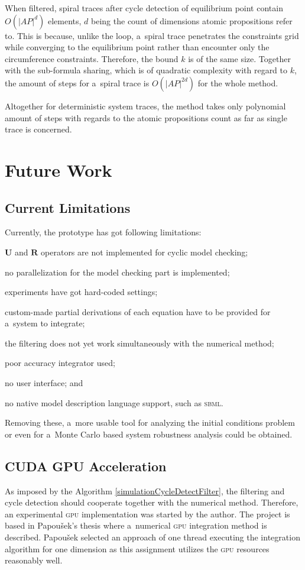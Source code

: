 \documentclass[12pt,twoside,draft]{fithesis}
\newcommand{\bU}{\mathbf{U}}
\newcommand{\bR}{\mathbf{R}}
\begin{document}
When filtered, spiral traces after cycle detection of equilibrium point
contain $O(|AP|^d)$ elements, $d$ being the count of dimensions atomic
propositions refer to. This is because, unlike the loop, a~spiral trace
penetrates the constraints grid while converging to the equilibrium
point rather than encounter only the circumference constraints.
Therefore, the bound $k$ is of the same size. Together with the
sub-formula sharing, which is of quadratic complexity with regard to $k$,
the amount of steps for a~spiral trace is $O(|AP|^{2d})$ for the whole
method.

Altogether for deterministic system traces, the method takes only
polynomial amount of steps with regards to the atomic propositions
count as far as single trace is concerned.

\chapter{Future Work}
\section{Current Limitations}
Currently, the prototype has got following limitations:
\begin{inparaenum}
\item $\bU$ and $\bR$ operators are not implemented for cyclic model
	checking;
\item no parallelization for the model checking part is implemented;
\item experiments have got hard-coded settings;
\item custom-made partial derivations of each equation have to be
	provided for a~system to integrate;
\item the filtering does not yet work simultaneously with the numerical
	method;
\item poor accuracy integrator used;
\item no user interface; and
\item no native model description language support, such as
	\textsc{sbml}\cite{sbml}.
\end{inparaenum}

Removing these, a~more usable tool for analyzing the initial conditions
problem\cite{sven} or even for a~Monte Carlo based system robustness
analysis\cite{rizk} could be obtained.

\section{CUDA GPU Acceleration}
As imposed by the Algorithm \ref{simulationCycleDetectFilter}, the
filtering and cycle detection should cooperate together with the
numerical method. Therefore, an experimental \textsc{gpu} implementation
was started by the author\cite{me:cuda}. The project is based in
Papou\v{s}ek's thesis\cite{papousek} where a~numerical \textsc{gpu}
integration method is described. Papou\v{s}ek selected an approach of
one thread executing the integration algorithm for one dimension as this
assignment utilizes the \textsc{gpu} resources reasonably
well\cite{papousek}.
\end{document}

